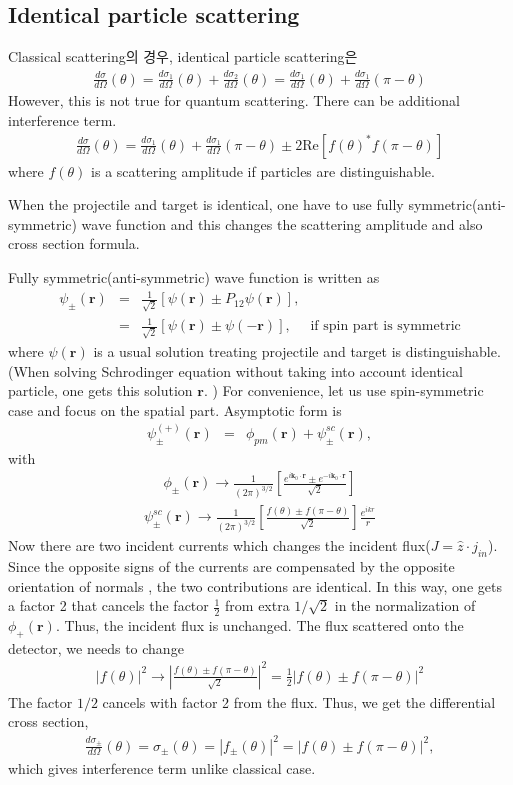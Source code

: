 \documentclass[10pt]{book}
\def\bm{\boldsymbol}
\newcommand{\bea}{\begin{eqnarray}}
\newcommand{\eea}{\end{eqnarray}}
\newcommand{\no}{\nonumber \\}
\def\vk{{\bm k}}
\def\vr{{\bm r}}
\begin{document}
\subsection{Identical particle scattering}
Classical scattering의 경우, identical particle scattering은 
\bea 
\frac{d\sigma}{d\Omega}(\theta) = \frac{d\sigma_1}{d\Omega}(\theta)+\frac{d\sigma_2}{d\Omega}(\theta)
 = \frac{d\sigma_1}{d\Omega}(\theta)+\frac{d\sigma_1}{d\Omega}(\pi-\theta)
\eea 
However, this is not true for quantum scattering. There can be additional interference term.
\bea 
\frac{d\sigma}{d\Omega}(\theta) 
= \frac{d\sigma_1}{d\Omega}(\theta)+\frac{d\sigma_1}{d\Omega}(\pi-\theta)
  \pm 2 \mbox{Re}[f(\theta)^* f(\pi-\theta)]
\eea 
where $f(\theta)$ is a scattering amplitude if particles are distinguishable.

When the projectile and target is identical, one have to use fully symmetric(anti-symmetric)
wave function and this changes the scattering amplitude and also cross section formula. 

Fully symmetric(anti-symmetric) wave function is written as
\bea 
\psi_{\pm}(\vr) &=& \frac{1}{\sqrt{2}}[\psi(\vr)\pm P_{12}\psi(\vr)],\no 
                &=& \frac{1}{\sqrt{2}}[\psi(\vr)\pm \psi(-\vr)],\quad \mbox{ if spin part is symmetric} 
\eea 
where $\psi(\vr)$ is a usual solution treating projectile and target is distinguishable. 
(When solving Schrodinger equation without taking into account identical particle, 
one gets this solution $\vr$. )
For convenience, let us use spin-symmetric case and focus on the spatial part. 
Asymptotic form is
\bea 
\psi^{(+)}_\pm(\vr) &=& \phi_{pm}(\vr)+\psi^{sc}_\pm(\vr),
\eea 
with 
\bea 
\phi_\pm(\vr)\to \frac{1}{(2\pi)^{3/2}}
   \left[ \frac{e^{i\vk_0\cdot\vr}\pm e^{-i\vk_0\cdot\vr}}{\sqrt{2}}   \right] 
\eea 
\bea 
\psi^{sc}_\pm(\vr)\to \frac{1}{(2\pi)^{3/2}}
\left[ \frac{f(\theta)\pm f(\pi-\theta)}{\sqrt{2}}   \right]\frac{e^{ikr}}{r} 
\eea 
Now there are two incident currents which changes the incident flux($J=\hat{z}\cdot j_{in}$).
Since the opposite signs of the currents are compensated by the opposite orientation of normals
, the two contributions are identical. In this way,
one gets a factor 2 that cancels  the factor $\frac{1}{2}$ from extra $1/\sqrt{2}$
in the normalization of $\phi_{+}(\vr)$. Thus, the incident flux is unchanged. 
The flux scattered onto the detector, we needs to change 
\bea 
|f(\theta)|^2\to |\frac{f(\theta)\pm f(\pi-\theta)}{\sqrt{2}}|^2
               =\frac{1}{2}|f(\theta)\pm f(\pi-\theta)|^2
\eea 
The factor $1/2$ cancels with factor 2 from the flux. Thus, we get the 
differential cross section,
\bea 
\frac{d\sigma_{\pm}}{d\Omega}(\theta)=\sigma_\pm(\theta) 
= |f_{\pm}(\theta)|^2 =|f(\theta)\pm f(\pi-\theta)|^2,
\eea  
which gives interference term unlike classical case. 
\end{document}

